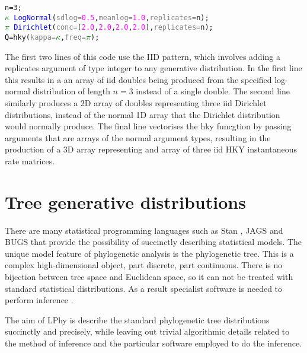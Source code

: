 \documentclass[10pt,letterpaper,table]{article}
\begin{document}
{\singlespacing
\begin{alltt}
  n = 3;
  \textcolor{green}{\(\kappa\)} ~ \textcolor{blue}{LogNormal}(\textcolor{gray}{sdlog=}\textcolor{magenta}{0.5}, \textcolor{gray}{meanlog=}\textcolor{magenta}{1.0}, \textcolor{gray}{replicates=}n);
  \textcolor{green}{\(\pi\)} ~ \textcolor{blue}{Dirichlet}(\textcolor{gray}{conc=}[\textcolor{magenta}{2.0}, \textcolor{magenta}{2.0}, \textcolor{magenta}{2.0}, \textcolor{magenta}{2.0}], \textcolor{gray}{replicates=}n);
  \textcolor{black}{Q = }\textcolor{magenta!80!black}{hky}(\textcolor{gray}{kappa=}\textcolor{green}{\(\kappa\)}, \textcolor{gray}{freq=}\textcolor{green}{\(\pi\)});

\end{alltt} 

The first two lines of this code use the IID pattern, which involves adding a replicates argument of type integer to any generative distribution. In the first line this results in a an array of iid doubles being produced from the specified log-normal distribution of length $n = 3$ instead of a single double. The second line similarly produces a 2D array of doubles representing three iid Dirichlet distributions, instead of the normal 1D array that the Dirichlet distribution would normally produce. The final line vectorises the hky funcgtion by passing arguments that are arrays of the normal argument types, resulting in the production of a 3D array representing and array of three iid HKY instantaneous rate matrices.

\section*{Tree generative distributions}

There are many statistical programming languages such as Stan
\cite{carpenter2017stan}, JAGS \cite{plummer2003jags} and BUGS \cite{lunn2009bugs, gilks1994language} that provide the possibility
of succinctly describing statistical models. The unique model feature of
phylogenetic analysis is the phylogenetic tree.
This is a complex high-dimensional object, part discrete, part
continuous.
There is no bijection between tree space and Euclidean space, so it
can not be treated with standard statistical distributions.
As a result specialist software is needed to perform inference \cite{hohna2016revbayes,bouckaert2019beastanalysis}.

The aim of LPhy is describe the standard phylogenetic tree
distributions succinctly and precisely, while leaving out trivial algorithmic details related to the method
of inference and the particular software employed to do the inference.

}
\end{document}

